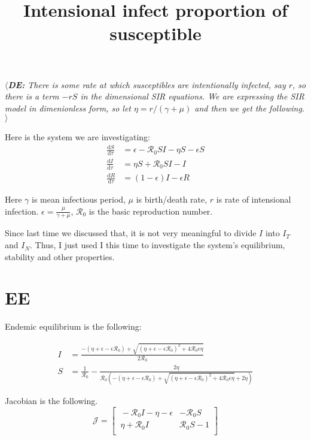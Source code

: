 \documentclass[12pt]{article}
\title{Intensional infect proportion of susceptible}
\newcommand{\de}[1]{$\langle${{\color{cyan}\slshape{\bfseries DE:} #1}$\rangle$}}
\begin{document}
\maketitle

\de{There is some rate at which susceptibles are intentionally infected, say $r$, so there is a term $-rS$ in the dimensional SIR equations.  We are expressing the SIR model in dimenionless form, so let $\eta=r/(\gamma+\mu)$ and then we get the following.}

Here is the system we are investigating:
\begin{align}
\frac{\mathrm{d}S}{\mathrm{d}\tau}&=\epsilon -\mathcal{R}_0 SI-\eta S-\epsilon S\\
\frac{\mathrm{d}I}{\mathrm{d}\tau}&=\eta S+\mathcal{R}_0 SI-I\\
\frac{\mathrm{d}R}{\mathrm{d}\tau}&=(1-\epsilon)I-\epsilon R
\end{align}

Here $\gamma$ is mean infectious period, $\mu$ is birth/death rate, $r$ is rate of intensional infection. $\epsilon=\frac{\mu}{\gamma+\mu}$, $\mathcal{R}_0$ is the basic reproduction number.

Since last time we discussed that, it is not very meaningful to divide $I$ into $I_T$ and $I_N$. Thus, I just used I this time to investigate the system's equilibrium, stability and other properties.
\section{EE}
Endemic equilibrium is the following:

\begin{align}
I &= \frac{-(\eta+\epsilon-\epsilon\mathcal{R}_0)+\sqrt{(\eta+\epsilon-\epsilon\mathcal{R}_0)^2+4\mathcal{R}_0\epsilon \eta}}{2\mathcal{R}_0}\\
S &= \frac{1}{\mathcal{R}_0}-\frac{2\eta}{\mathcal{R}_0(-(\eta+\epsilon-\epsilon\mathcal{R}_0)+\sqrt{(\eta+\epsilon-\epsilon\mathcal{R}_0)^2+4\mathcal{R}_0\epsilon \eta}+2\eta)}
\end{align}

Jacobian is the following.
\begin{equation}
\mathcal{J} =
\begin{bmatrix}
    \ -\mathcal{R}_0 I-\eta-\epsilon       & -\mathcal{R}_0 S \\
    \ \eta+\mathcal{R}_0 I       & \mathcal{R}_0 S-1 \\
\end{bmatrix}
\end{equation}
\end{document}
